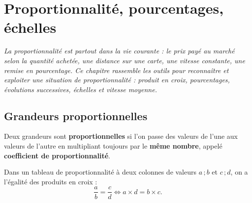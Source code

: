 \chapter{Proportionnalité, pourcentages, échelles}

\noindent\textit{La proportionnalité est partout dans la vie courante : le prix payé au
marché selon la quantité achetée, une distance sur une carte, une vitesse constante, une
remise en pourcentage. Ce chapitre rassemble les outils pour reconnaître et exploiter une
situation de proportionnalité : produit en croix, pourcentages, évolutions successives,
échelles et vitesse moyenne.}
\vspace{8pt}

\connecteBanner

\section{Grandeurs proportionnelles}

\begin{definition}
Deux grandeurs sont \textbf{proportionnelles} si l'on passe des valeurs de l'une aux valeurs
de l'autre en multipliant toujours par le \textbf{même nombre}, appelé \textbf{coefficient de
proportionnalité}.
\end{definition}

\begin{propriete}
Dans un tableau de proportionnalité à deux colonnes de valeurs $a\,;b$ et $c\,;d$, on a
l'égalité des produits en croix :
\[
\frac ab=\frac cd \iff a\times d=b\times c.
\]
\end{propriete}

\begin{illus}
\end{illus}

